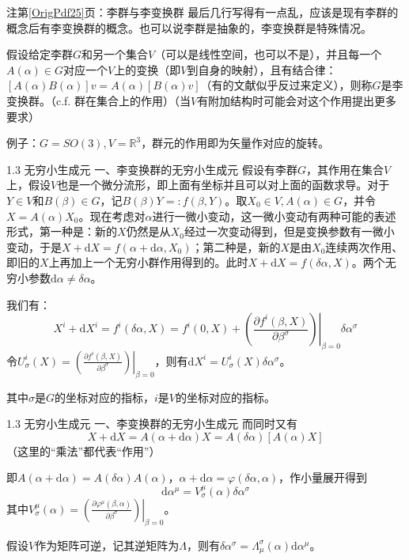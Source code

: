 \documentclass{beamer}
\newcommand{\refpage}[1]{注第\ref{OrigPdf#1}页}%
\newcommand{\pp}[2]{\frac{\partial #1}{\partial #2}}
\newcommand{\ppat}[3]{\left.\left(\pp{#1}{#2}\right)\right|_{#3}}
\newcommand{\di}{\mathrm d}
\begin{document}
\begin{frame}{\refpage{25}：李群与李变换群}
	最后几行写得有一点乱，应该是现有李群的概念后有李变换群的概念。也可以说李群是抽象的，李变换群是特殊情况。
	
	假设给定李群$G$和另一个集合$V$（可以是线性空间，也可以不是），并且每一个$A(\alpha)\in G$对应一个$V$上的变换（即$V$到自身的映射），且有结合律：$[A(\alpha)B(\alpha)]v=A(\alpha)[B(\alpha)v]$（有的文献似乎反过来定义），则称$G$是李变换群。（c.f. 群在集合上的作用）（当$V$有附加结构时可能会对这个作用提出更多要求）
	
	例子：$G=SO(3),V=\mathbb R^3$，群元的作用即为矢量作对应的旋转。
\end{frame}

\begin{frame}{1.3 无穷小生成元}
	{\large 一、李变换群的无穷小生成元}
	假设有李群$G$，其作用在集合$V$上，假设$V$也是一个微分流形，即上面有坐标并且可以对上面的函数求导。对于$Y\in V$和$B(\beta)\in G$，记$B(\beta)Y=:f(\beta,Y)$。取$X_0\in V,A(\alpha)\in G$，并令$X=A(\alpha)X_0$。现在考虑对$\alpha$进行一微小变动，这一微小变动有两种可能的表述形式，第一种是：新的$X$仍然是从$X_0$经过一次变动得到，但是变换参数有一微小变动，于是$X+\di X=f(\alpha+\di\alpha,X_0)$；第二种是，新的$X$是由$X_0$连续两次作用、即旧的$X$上再加上一个无穷小群作用得到的。此时$X+\di X=f(\delta\alpha,X)$。两个无穷小参数$\di\alpha\neq\delta\alpha$。
	
	我们有：
	\begin{equation*}
	X^i+\di X^i=f^i(\delta\alpha, X)=f^i(0,X)+\ppat{f^i(\beta,X)}{\beta^\sigma}{\beta=0}\delta\alpha^\sigma
	\end{equation*}
	令$U^i_\sigma(X)=\ppat{f^i(\beta,X)}{\beta^\sigma}{\beta=0}$，则有$\di X^i=U^i_\sigma(X)\delta\alpha^\sigma$。	
	
	其中$\sigma$是$G$的坐标对应的指标，$i$是$V$的坐标对应的指标。
\end{frame}

\begin{frame}{1.3 无穷小生成元}
	{\large 一、李变换群的无穷小生成元}
	而同时又有
	\begin{equation*}
	X+\di X=A(\alpha+\di\alpha)X=A(\delta\alpha)[A(\alpha) X]
	\end{equation*}
	（这里的“乘法”都代表“作用”）
	
	即$A(\alpha+\di\alpha)=A(\delta\alpha)A(\alpha)$，$\alpha+\di\alpha=\varphi(\delta\alpha,\alpha)$，作小量展开得到
	\begin{equation*}
	\di\alpha^\mu=V^\mu_\sigma(\alpha)\delta\alpha^\sigma
	\end{equation*}
	其中$V^\mu_\sigma(\alpha)=\ppat{\varphi^\mu(\beta,\alpha)}{\beta^\sigma}{\beta=0}$。
	
	假设$V$作为矩阵可逆，记其逆矩阵为$\Lambda$，则有$\delta\alpha^\sigma=\Lambda^\sigma_\mu(\alpha)\di\alpha^\mu$。
\end{frame}
\end{document}
